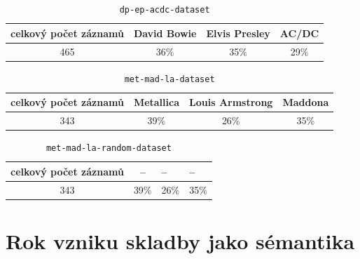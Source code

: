 \documentclass[thesis=M,czech]{FITthesis}[2012/06/26]
\begin{document}
\begin{table}[!htbp]
    \captionsetup{
      justification=raggedright,
      singlelinecheck=false
    }

    \caption{\texttt{dp-ep-acdc-dataset}}
    \label{sec:db-ep-acdc-dataset}
    \begin{tabular}{|c|c|l|l|}
    \hline
    celkový počet záznamů      & David Bowie                  & Elvis Presley                   &  AC/DC                     \\ \hline
    {\color[HTML]{000000} 465} & {\color[HTML]{000000} 36\%} & \multicolumn{1}{c|}{35\%} & \multicolumn{1}{c|}{29\%} \\ \hline
    \end{tabular}
\end{table}


\begin{table}[!htbp]
    \captionsetup{
      justification=raggedright,
      singlelinecheck=false
    }

    \caption{\texttt{met-mad-la-dataset}}
    \label{sec:met-mad-la-dataset}
    \begin{tabular}{|c|c|l|l|}
    \hline
    celkový počet záznamů      & Metallica                  & Louis Armstrong                   &  Maddona                     \\ \hline
    {\color[HTML]{000000} 343} & {\color[HTML]{000000} 39\%} & \multicolumn{1}{c|}{26\%} & \multicolumn{1}{c|}{35\%} \\ \hline
    \end{tabular}
\end{table}



\begin{table}[!htbp]
    \captionsetup{
      justification=raggedright,
      singlelinecheck=false
    }

    \caption{\texttt{met-mad-la-random-dataset}}
    \label{sec:met-mad-la-random-dataset}
    \begin{tabular}{|c|c|l|l|}
    \hline
    celkový počet záznamů      & --                 & --                  &  --                     \\ \hline
    {\color[HTML]{000000} 343} & {\color[HTML]{000000} 39\%} & \multicolumn{1}{c|}{26\%} & \multicolumn{1}{c|}{35\%} \\ \hline
    \end{tabular}
\end{table}


\section{Rok vzniku skladby jako sémantika}
\end{document}
